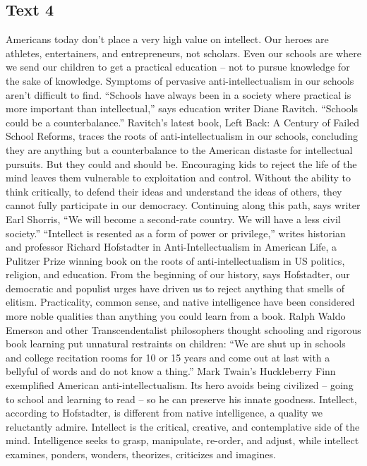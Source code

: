 \subsection{Text 4}
Americans today don’t place a very high value on intellect. Our heroes are athletes, entertainers, and entrepreneurs, not scholars. Even our schools are where we send our children to get a practical education -- not to pursue knowledge for the sake of knowledge. Symptoms of pervasive anti-intellectualism in our schools aren’t difficult to find.
“Schools have always been in a society where practical is more important than intellectual,” says education writer Diane Ravitch. “Schools could be a counterbalance.” Ravitch’s latest book, Left Back: A Century of Failed School Reforms, traces the roots of anti-intellectualism in our schools, concluding they are anything but a counterbalance to the American distaste for intellectual pursuits.
But they could and should be. Encouraging kids to reject the life of the mind leaves them vulnerable to exploitation and control. Without the ability to think critically, to defend their ideas and understand the ideas of others, they cannot fully participate in our democracy. Continuing along this path, says writer Earl Shorris, “We will become a second-rate country. We will have a less civil society.”
“Intellect is resented as a form of power or privilege,” writes historian and professor Richard Hofstadter in Anti-Intellectualism in American Life, a Pulitzer Prize winning book on the roots of anti-intellectualism in US politics, religion, and education. From the beginning of our history, says Hofstadter, our democratic and populist urges have driven us to reject anything that smells of elitism. Practicality, common sense, and native intelligence have been considered more noble qualities than anything you could learn from a book.
Ralph Waldo Emerson and other Transcendentalist philosophers thought schooling and rigorous book learning put unnatural restraints on children: “We are shut up in schools and college recitation rooms for 10 or 15 years and come out at last with a bellyful of words and do not know a thing.” Mark Twain’s Huckleberry Finn exemplified American anti-intellectualism. Its hero avoids being civilized -- going to school and learning to read -- so he can preserve his innate goodness.
Intellect, according to Hofstadter, is different from native intelligence, a quality we reluctantly admire. Intellect is the critical, creative, and contemplative side of the mind. Intelligence seeks to grasp, manipulate, re-order, and adjust, while intellect examines, ponders, wonders, theorizes, criticizes and imagines.
